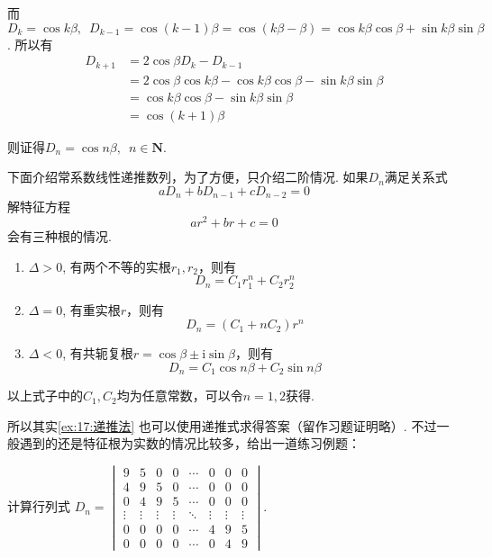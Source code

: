 \begin{solution}
    而$D_{k}=\cos k \beta,\enspace
    D_{k-1}=\cos (k-1)\beta
    =\cos (k \beta-\beta)
    =\cos k \beta \cos \beta+\sin k \beta \sin \beta$.
    所以有
    \begin{align*}
    D_{k+1}&= 2 \cos \beta D_{k}-D_{k-1} \\
    &=2 \cos \beta \cos k \beta-\cos k \beta \cos \beta-\sin k \beta \sin \beta \\
    &=\cos k \beta \cos \beta-\sin k \beta \sin \beta \\
    &=\cos (k+1) \beta
    \end{align*}

    则证得$D_n=\cos n\beta,\enspace n\in \mathbf{N}$.
\end{solution}

下面介绍常系数线性递推数列，为了方便，只介绍二阶情况.
如果$D_n$满足关系式
\[ aD_n+bD_{n-1}+cD_{n-2}=0 \]
解特征方程
\[ ar^2+br+c=0 \]
会有三种根的情况.
\begin{enumerate}[label=(\arabic*)]
    \item $\Delta>0$, 有两个不等的实根$r_1, r_2$，则有
    \[ D_n=C_1r_1^n+C_2r_2^n \]

    \item $\Delta=0$, 有重实根$r$，则有
    \[ D_n=(C_1+nC_2)r^n \]

    \item $\Delta<0$, 有共轭复根$r=\cos\beta\pm \mathrm{i}\sin\beta$，则有
    \[ D_n=C_1\cos n\beta + C_2\sin n\beta \]
\end{enumerate}
以上式子中的$C_1,C_2$均为任意常数，可以令$n=1,2$获得.

所以其实\autoref{ex:17:递推法} 也可以使用递推式求得答案（留作习题证明略）.
不过一般遇到的还是特征根为实数的情况比较多，给出一道练习例题：

\begin{example}
    计算行列式
    $D_n=
    \begin{vmatrix}
        9 & 5 & 0 & 0 & \cdots & 0 & 0 & 0 \\
        4 & 9 & 5 & 0 & \cdots & 0 & 0 & 0 \\
        0 & 4 & 9 & 5 & \cdots & 0 & 0 & 0 \\
        \vdots & \vdots & \vdots & \vdots & \ddots & \vdots & \vdots & \vdots \\
        0 & 0 & 0 & 0 & \cdots & 4 & 9 & 5 \\
        0 & 0 & 0 & 0 & \cdots & 0 & 4 & 9
    \end{vmatrix}$.
\end{example}

